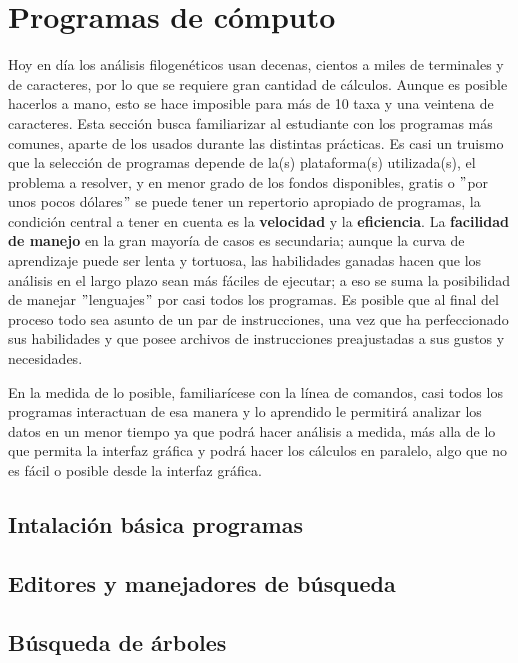 \chapter{Programas de c\'omputo}
\label{ch:programas}

Hoy en d\'ia los an\'alisis filogen\'eticos usan decenas, cientos a 
miles de terminales y de caracteres, por lo que se requiere gran  
cantidad de c\'alculos. Aunque es posible hacerlos a mano, esto se hace 
imposible para m\'as de 10 taxa y una veintena de caracteres. Esta 
secci\'on busca familiarizar al estudiante con los programas m\'as 
comunes, aparte de los usados durante las distintas pr\'acticas. Es 
casi un truismo que la selecci\'on de programas depende de la(s) 
plataforma(s) utilizada(s), el problema a resolver, y en menor grado de 
los fondos disponibles, gratis o $"$por unos pocos d\'olares$"$ se 
puede tener un repertorio apropiado de programas, la condici\'on 
central a tener en cuenta es la \textbf{velocidad} y la 
\textbf{eficiencia}. La \textbf{facilidad de manejo} en la gran 
mayor\'ia de casos es secundaria; aunque la curva de aprendizaje puede 
ser lenta y tortuosa, las habilidades ganadas hacen que los an\'alisis 
en el largo plazo sean m\'as f\'aciles de ejecutar; a eso se suma la 
posibilidad de manejar $"$lenguajes$"$ por casi todos los programas. Es 
posible que al final del proceso todo sea asunto de un par de 
instrucciones, una vez que ha perfeccionado sus habilidades y que posee 
archivos de instrucciones preajustadas a sus gustos y necesidades. 

En la medida de lo posible, familiar\'icese con la l\'inea de comandos, 
casi todos los programas interactuan de esa manera y lo aprendido le 
permitir\'a analizar los datos en un menor tiempo ya que podr\'a hacer 
an\'alisis a medida, m\'as alla de lo que permita la interfaz gr\'afica 
y podr\'a hacer los c\'alculos en paralelo, algo que no es f\'acil o 
posible desde la interfaz gr\'afica.

\newpage

\section{Intalaci\'on b\'asica programas}


\section{Editores y manejadores de b\'usqueda}


\section{B\'usqueda de \'arboles}





%
%
%


